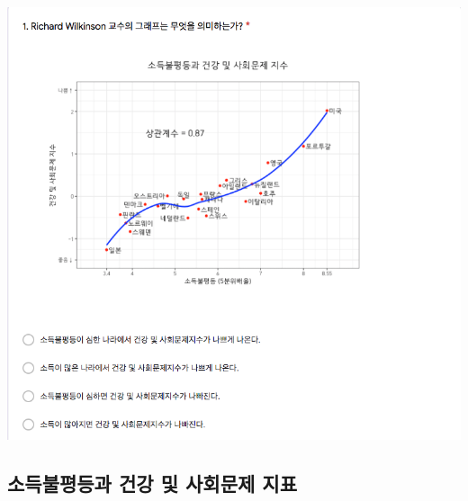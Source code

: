 \documentclass[
]{book}
\begin{document}
\includegraphics[width=0.75\linewidth]{./pics/Quiz201026_01}

\subsection{소득불평등과 건강 및 사회문제 지표}\label{uxc18cuxb4dduxbd88uxd3c9uxb4f1uxacfc-uxac74uxac15-uxbc0f-uxc0acuxd68cuxbb38uxc81c-uxc9c0uxd45c-2}
\end{document}
